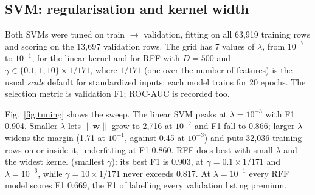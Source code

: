 \documentclass[10pt,twocolumn,a4paper]{article}
\begin{document}
\subsection{SVM: regularisation and kernel width}
Both SVMs were tuned on train $\to$ validation, fitting on all 63{,}919 %
training rows and scoring on the 13{,}697 validation rows. %
The grid has 7 values of $\lambda$, %
from $10^{-7}$ to $10^{-1}$, %
for the linear kernel and for RFF with $D = 500$ %
and $\gamma \in \{0.1, 1, 10\} \times 1/171$, %
where $1/171$ (one over the number of features) is the usual
\emph{scale} default for standardized inputs; each model trains for
20 epochs. %
The selection metric is validation F1; ROC-AUC is recorded too. %

Fig.~\ref{fig:tuning} shows the sweep. The linear SVM peaks at
$\lambda = 10^{-3}$ with F1 0.904. %
Smaller $\lambda$ lets $\lVert\mathbf{w}\rVert$ grow to 2{,}716 at
$10^{-7}$ %
and F1 fall to 0.866; %
larger $\lambda$ widens the margin (1.71 at $10^{-1}$, against 0.45 at %
$10^{-3}$) and puts 32{,}036 training rows on or inside it, %
underfitting at F1 0.860. %
RFF does best with small $\lambda$ and the widest kernel (smallest
$\gamma$): its best F1 is 0.903, at $\gamma = 0.1 \times 1/171$ and %
$\lambda = 10^{-6}$, while $\gamma = 10 \times 1/171$ never exceeds 0.817. %
At $\lambda = 10^{-1}$ every RFF model scores F1 0.669, %
the F1 of labelling every validation listing premium. %
\end{document}
